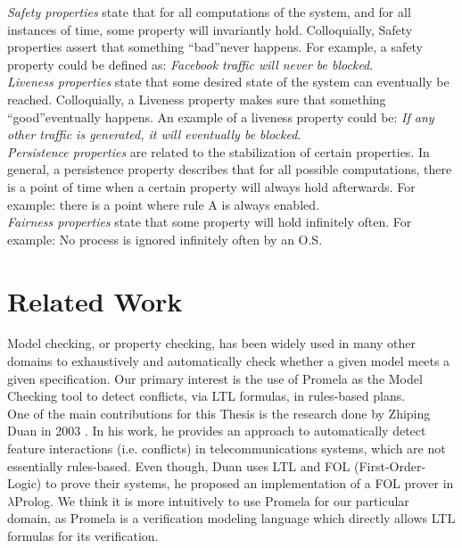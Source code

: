 \emph{Safety properties} state that for all computations of the system, and for all instances of time, some property will invariantly hold. Colloquially, Safety properties assert that something \textquotedblleft bad\textquotedblright never happens. For example, a safety property could be defined as: \emph{Facebook traffic will never be blocked}. \\

\emph{Liveness properties} state that some desired state of the system can eventually be reached. Colloquially, a Liveness property makes sure that something \textquotedblleft good\textquotedblright  eventually happens. An example of a liveness property could be: \emph{If any other traffic is generated, it will eventually be blocked}. \\

\emph{Persistence properties} are related to the stabilization of certain properties. In general, a persistence property describes that for all possible computations, there is a point of time when a certain property will always hold afterwards. For example: there is a point where rule A is always enabled.\\

\emph{Fairness properties} state that some property will hold infinitely often. For example: No process is ignored infinitely often by an O.S. 
\section{Related Work}
\noindent
Model checking, or property checking, has been widely used in many other domains to exhaustively and automatically check whether a given model meets a given specification. Our primary interest is the use of Promela as the Model Checking tool to detect conflicts, via LTL formulas, in rules-based plans. \\

One of the main contributions for this Thesis is the research done by Zhiping Duan in 2003 \cite{Duan2003}. In his work, he provides an approach to automatically detect feature interactions (i.e. conflicts) in telecommunications systems, which are not essentially rules-based. Even though, Duan uses LTL and FOL (First-Order-Logic) to prove their systems, he proposed an implementation of a FOL prover in $\lambda$Prolog. We think it is more intuitively to use Promela for our particular domain, as Promela is a verification modeling language which directly allows LTL formulas for its verification. \\

